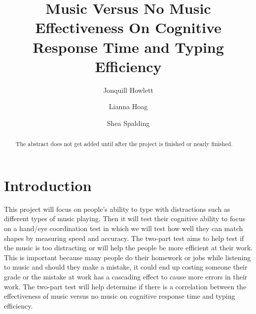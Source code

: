 \documentclass[manuscript, screen]{acmart} %
\begin{document}
\title{Music Versus No Music Effectiveness On Cognitive Response Time and Typing Efficiency}

\author{Jonquill Howlett}

\author{Lianna Hoag}

\author{Shea Spalding}

\renewcommand{\shortauthors}{Howlett, Hoag, Spalding} %

\begin{abstract}
The abstract does not get added until after the project is finished or nearly finished.
\end{abstract}

\maketitle

\section{Introduction}
This project will focus on people's ability to type with distractions such as different types of music playing. Then it will test their cognitive ability to focus on a hand/eye coordination test in which we will test how well they can match shapes by measuring speed and accuracy. 
The two-part test aims to help test if the music is too distracting or will help the people be more efficient at their work. 
This is important because many people do their homework or jobs while listening to music and should they make a mistake, it could end up costing someone their grade or the mistake at work has a cascading effect to cause more errors in their work. 
The two-part test will help determine if there is a correlation between the effectiveness of music versus no music on cognitive response time and typing efficiency.
\end{document}
